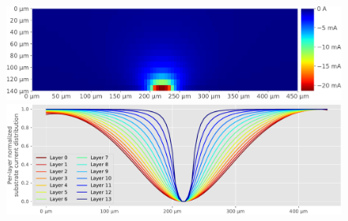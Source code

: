 \begin{figure}[hbtp]
\begin{minipage}{0.3\textwidth}
		\includegraphics[width=\textwidth]{./figures/modelesSimusResul/dualWell/negative/iSubcManuscrit-cropped.pdf}
		\includegraphics[width=\textwidth]{./figures/modelesSimusResul/dualWell/negative/CurrentDistributionNormT140eT10_ExcDw-cropped.pdf}
	\end{minipage}


\end{figure}

